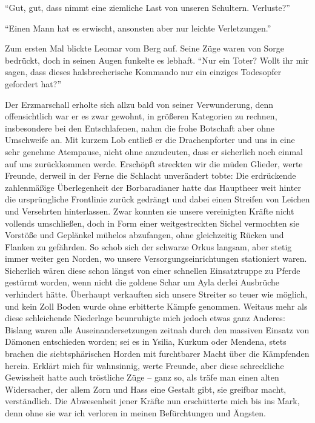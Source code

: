 ``Gut, gut, dass nimmt eine ziemliche Last von unseren Schultern. Verluste?''

``Einen Mann hat es erwischt, ansonsten aber nur leichte Verletzungen.''

Zum ersten Mal blickte Leomar vom Berg auf. Seine Züge waren von Sorge bedrückt, doch in seinen Augen funkelte es lebhaft.
``Nur ein Toter? Wollt ihr mir sagen, dass dieses halsbrecherische Kommando nur ein einziges Todesopfer gefordert hat?''

Der Erzmarschall erholte sich allzu bald von seiner Verwunderung, denn offensichtlich war er es zwar gewohnt, in größeren Kategorien zu rechnen, insbesondere bei den Entschlafenen, nahm die frohe Botschaft aber ohne Umschweife an. Mit kurzem Lob entließ er die Drachenpforter und uns in eine sehr genehme Atempause, nicht ohne anzudeuten, dass er sicherlich noch einmal auf uns zurückkommen werde. Erschöpft streckten wir die müden Glieder, werte Freunde, derweil in der Ferne die Schlacht unverändert tobte: Die erdrückende zahlenmäßige Überlegenheit der Borbaradianer hatte das Hauptheer weit hinter die ursprüngliche Frontlinie zurück gedrängt und dabei einen Streifen von Leichen und Versehrten hinterlassen. Zwar konnten sie unsere vereinigten Kräfte nicht vollends umschließen, doch in Form einer weitgestreckten Sichel vermochten sie Vorstöße und Geplänkel mühelos abzufangen, ohne gleichzeitig Rücken und Flanken zu gefährden. So schob sich der schwarze Orkus langsam, aber stetig immer weiter gen Norden, wo unsere Versorgungseinrichtungen stationiert waren. Sicherlich wären diese schon längst von einer schnellen Einsatztruppe zu Pferde gestürmt worden, wenn nicht die goldene Schar um Ayla derlei Ausbrüche verhindert hätte. Überhaupt verkauften sich unsere Streiter so teuer wie möglich, und kein Zoll Boden wurde ohne erbitterte Kämpfe genommen. Weitaus mehr als diese schleichende Niederlage beunruhigte mich jedoch etwas ganz Anderes: Bislang waren alle Auseinandersetzungen zeitnah durch den massiven Einsatz von Dämonen entschieden worden; sei es in Ysilia, Kurkum oder Mendena, stets brachen die siebtsphärischen Horden mit furchtbarer Macht über die Kämpfenden herein. Erklärt mich für wahnsinnig, werte Freunde, aber diese schreckliche Gewissheit hatte auch tröstliche Züge -- ganz so, als träfe man einen alten Widersacher, der allem Zorn und Hass eine Gestalt gibt, sie greifbar macht, verständlich. Die Abwesenheit jener Kräfte nun erschütterte mich bis ins Mark, denn ohne sie war ich verloren in meinen Befürchtungen und Ängsten.

